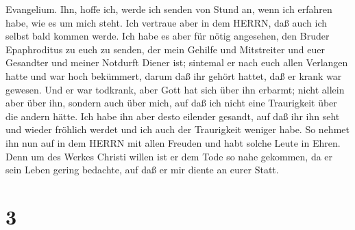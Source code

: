 Evangelium.  Ihn, hoffe ich, werde ich senden von Stund an,
wenn ich erfahren habe, wie es um mich steht.  Ich vertraue
aber in dem HERRN, daß auch ich selbst bald kommen werde. 
Ich habe es aber für nötig angesehen, den Bruder Epaphroditus zu euch zu
senden, der mein Gehilfe und Mitstreiter und euer Gesandter und meiner
Notdurft Diener ist;  sintemal er nach euch allen Verlangen
hatte und war hoch bekümmert, darum daß ihr gehört hattet, daß er krank
war gewesen.  Und er war todkrank, aber Gott hat sich über
ihn erbarmt; nicht allein aber über ihn, sondern auch über mich, auf daß
ich nicht eine Traurigkeit über die andern hätte.  Ich habe
ihn aber desto eilender gesandt, auf daß ihr ihn seht und wieder
fröhlich werdet und ich auch der Traurigkeit weniger habe. 
So nehmet ihn nun auf in dem HERRN mit allen Freuden und habt solche
Leute in Ehren.  Denn um des Werkes Christi willen ist er
dem Tode so nahe gekommen, da er sein Leben gering bedachte, auf daß er
mir diente an eurer Statt.

\hypertarget{section-2}{%
\section{3}\label{section-2}}

